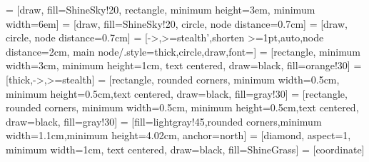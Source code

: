 
 = [draw, fill=ShineSky!20, rectangle, 
minimum height=3em, minimum width=6em]
 = [draw, fill=ShineSky!20, circle, node distance=0.7cm]
 = [draw, circle, node distance=0.7cm]
 = [->,>=stealth',shorten >=1pt,auto,node distance=2cm,
main node/.style={thick,circle,draw,font=\sffamily\Large}]
 = [rectangle, minimum width=3cm, minimum height=1cm, text 
centered, draw=black, fill=orange!30]
 = [thick,->,>=stealth]
 = [rectangle, rounded corners, minimum width=0.5cm, minimum 
height=0.5cm,text centered, draw=black, fill=gray!30]
 = [rectangle, rounded corners, minimum width=0.5cm, minimum 
height=0.5cm,text centered, draw=black, fill=gray!30]
 = [fill=lightgray!45,rounded corners,minimum 
width=1.1cm,minimum height=4.02cm, anchor=north]
 = [diamond, aspect=1, minimum width=1cm, text 
centered, draw=black, fill=ShineGrass]
 = [coordinate]

